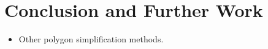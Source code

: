 \chapter*{Conclusion and Further Work}

\begin{itemize}
  \item Other polygon simplification methods.
\end{itemize}
